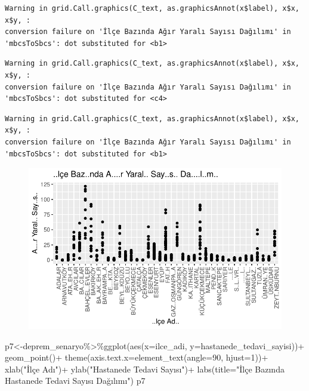 \documentclass[
  11pt,
  a4paper,
  DIV=11,
  numbers=noendperiod]{scrartcl}
\newenvironment{Shaded}{\begin{snugshade}}{\end{snugshade}}
\newcommand{\AttributeTok}[1]{\textcolor[rgb]{0.40,0.45,0.13}{#1}}
\newcommand{\DecValTok}[1]{\textcolor[rgb]{0.68,0.00,0.00}{#1}}
\newcommand{\FunctionTok}[1]{\textcolor[rgb]{0.28,0.35,0.67}{#1}}
\newcommand{\NormalTok}[1]{\textcolor[rgb]{0.00,0.23,0.31}{#1}}
\newcommand{\OtherTok}[1]{\textcolor[rgb]{0.00,0.23,0.31}{#1}}
\newcommand{\SpecialCharTok}[1]{\textcolor[rgb]{0.37,0.37,0.37}{#1}}
\newcommand{\StringTok}[1]{\textcolor[rgb]{0.13,0.47,0.30}{#1}}
\begin{document}
\begin{verbatim}
Warning in grid.Call.graphics(C_text, as.graphicsAnnot(x$label), x$x, x$y, :
conversion failure on 'İlçe Bazında Ağır Yaralı Sayısı Dağılımı' in
'mbcsToSbcs': dot substituted for <b1>
\end{verbatim}

\begin{verbatim}
Warning in grid.Call.graphics(C_text, as.graphicsAnnot(x$label), x$x, x$y, :
conversion failure on 'İlçe Bazında Ağır Yaralı Sayısı Dağılımı' in
'mbcsToSbcs': dot substituted for <c4>
\end{verbatim}

\begin{verbatim}
Warning in grid.Call.graphics(C_text, as.graphicsAnnot(x$label), x$x, x$y, :
conversion failure on 'İlçe Bazında Ağır Yaralı Sayısı Dağılımı' in
'mbcsToSbcs': dot substituted for <b1>
\end{verbatim}

\begin{figure}[H]

{\centering \includegraphics{project_files/figure-pdf/unnamed-chunk-4-2.pdf}

}

\end{figure}

\begin{Shaded}
\begin{Highlighting}[]
\NormalTok{p7}\OtherTok{\textless{}{-}}\NormalTok{deprem\_senaryo}\SpecialCharTok{\%\textgreater{}\%}\FunctionTok{ggplot}\NormalTok{(}\FunctionTok{aes}\NormalTok{(}\AttributeTok{x=}\NormalTok{ilce\_adi, }\AttributeTok{y=}\NormalTok{hastanede\_tedavi\_sayisi))}\SpecialCharTok{+}
  \FunctionTok{geom\_point}\NormalTok{()}\SpecialCharTok{+}
  \FunctionTok{theme}\NormalTok{(}\AttributeTok{axis.text.x=}\FunctionTok{element\_text}\NormalTok{(}\AttributeTok{angle=}\DecValTok{90}\NormalTok{, }\AttributeTok{hjust=}\DecValTok{1}\NormalTok{))}\SpecialCharTok{+}
  \FunctionTok{xlab}\NormalTok{(}\StringTok{"İlçe Adı"}\NormalTok{)}\SpecialCharTok{+}
  \FunctionTok{ylab}\NormalTok{(}\StringTok{"Hastanede Tedavi Sayısı"}\NormalTok{)}\SpecialCharTok{+}
  \FunctionTok{labs}\NormalTok{(}\AttributeTok{title=}\StringTok{"İlçe Bazında Hastanede Tedavi Sayısı Dağılımı"}\NormalTok{)}
\NormalTok{p7}
\end{Highlighting}
\end{Shaded}
\end{document}
